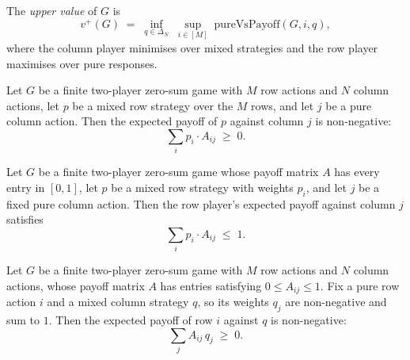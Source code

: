 \begin{definition}
\label{OnlineLearning.finiteUpperValue}
\leanok
{}
The \emph{upper value} of $G$ is
\[
  v^+(G) \;=\; \inf_{q \in \Delta_N}\; \sup_{i \in [M]}\; \mathrm{pureVsPayoff}(G,i,q),
\]
where the column player minimises over mixed strategies and the row player
maximises over pure responses.
\end{definition}

\begin{lemma}
\label{OnlineLearning.payoffVsPure_nonneg}
\leanok
{}
Let $G$ be a finite two-player zero-sum game with $M$ row actions and $N$ column
actions, let $p$ be a mixed row strategy over the $M$ rows, and let $j$ be a pure column
action. Then the expected payoff of $p$ against column $j$ is non-negative:
\[
  \sum_{i} p_i \cdot A_{ij} \;\ge\; 0.
\]
\end{lemma}

\begin{lemma}
\label{OnlineLearning.payoffVsPure_le_one}
\leanok
{}
Let $G$ be a finite two-player zero-sum game whose payoff matrix $A$ has every entry in
$[0,1]$, let $p$ be a mixed row strategy with weights $p_i$, and let $j$ be a fixed pure
column action. Then the row player's expected payoff against column $j$ satisfies \[
\sum_i p_i \cdot A_{ij} \;\le\; 1. \]
\end{lemma}

\begin{lemma}
\label{OnlineLearning.pureVsPayoff_nonneg}
\leanok
{}
Let $G$ be a finite two-player zero-sum game with $M$ row actions and $N$ column
actions, whose payoff matrix $A$ has entries satisfying $0 \le A_{ij} \le 1$. Fix a pure
row action $i$ and a mixed column strategy $q$, so its weights $q_j$ are non-negative
and sum to $1$. Then the expected payoff of row $i$ against $q$ is non-negative:
\[
  \sum_{j} A_{ij}\, q_j \;\ge\; 0.
\]
\end{lemma}

